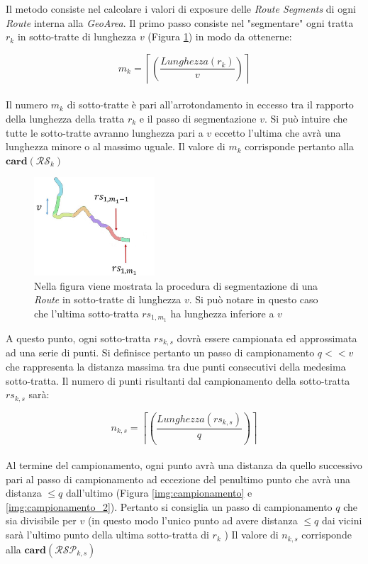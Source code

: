 \noindent Il metodo consiste nel calcolare i valori di exposure delle \textit{Route Segments} di ogni \textit{Route} interna alla \textit{GeoArea}.
Il primo passo consiste nel "segmentare" ogni tratta $r_k$ in sotto-tratte di lunghezza $v$ (Figura \ref{img:segment}) in modo da ottenerne:

\begin{equation}\label{eq:numerotratte}
m_{k}=\left\lceil\left(\frac{Lunghezza(r_k)}{v}\right)\right\rceil
\end{equation}
\\
Il numero $m_{k}$ di sotto-tratte è pari all'arrotondamento in eccesso tra il rapporto della lunghezza della tratta $r_k$ e il passo di segmentazione $v$. Si può intuire che tutte le sotto-tratte avranno lunghezza pari a $v$ eccetto l'ultima che avrà una lunghezza minore o al massimo uguale. Il valore di $m_k$ corrisponde pertanto alla $\mathbf{card}(\mathcal{RS}_{k})$
\\


	\begin{figure}[h]
	\centering
	\includegraphics[width=0.4\textwidth]{images/routes2_new}
	\caption{Nella figura viene mostrata la procedura di segmentazione di una \textit{Route} in sotto-tratte di lunghezza $v$. Si può notare in questo caso che  l'ultima sotto-tratta $rs_{1,{m_1}}$ ha lunghezza inferiore a $v$}
	\label{img:segment}
	\end{figure}

\noindent A questo punto, ogni sotto-tratta $rs_{k,s}$ dovrà essere campionata ed approssimata ad una serie di punti. Si definisce pertanto un passo di campionamento $q << v$ che rappresenta la distanza massima tra due punti consecutivi della medesima sotto-tratta. Il numero di punti risultanti dal campionamento della sotto-tratta $rs_{k,s}$ sarà:

\begin{equation}\label{eq:numerotratte}
n_{k,s}=\left\lceil\left(\frac{Lunghezza(rs_{k,s})}{q}\right)\right\rceil
\end{equation}
\\
Al termine del campionamento, ogni punto avrà una distanza da quello successivo pari al passo di campionamento ad eccezione del penultimo punto che avrà una distanza $\le q$ dall'ultimo (Figura \ref{img:campionamento} e \ref{img:campionamento_2}). Pertanto si consiglia un passo di campionamento $q$ che sia divisibile per $v$ (in questo modo l'unico punto ad avere distanza $\le q$ dai vicini sarà l'ultimo punto della ultima sotto-tratta di $r_k$ ) Il valore di $n_{k,s}$ corrisponde alla $\mathbf{card}(\mathcal{RSP}_{k,s})$
\\

